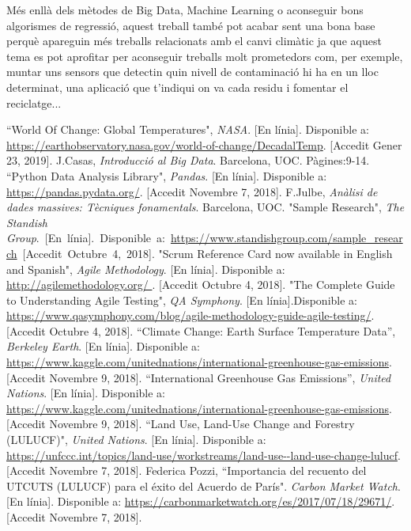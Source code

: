 \documentclass[10pt,a4paper,twocolumn,twoside]{article}
\begin{document}
Més enllà dels mètodes de Big Data, Machine Learning o aconseguir bons algorismes de regressió, aquest treball també pot acabar sent una bona base perquè apareguin més treballs relacionats amb el canvi climàtic ja que aquest tema es pot aprofitar per aconseguir treballs molt prometedors com, per exemple, muntar uns sensors que detectin quin nivell de contaminació hi ha en un lloc determinat, una aplicació que t'indiqui on va cada residu i fomentar el reciclatge...

\begin{thebibliography}{11}
``World Of Change: Global Temperatures", \textit{NASA}. [En línia]. Disponible a: \url{https://earthobservatory.nasa.gov/world-of-change/DecadalTemp}. [Accedit Gener 23, 2019].
J.Casas, \textit{Introducció al Big Data}. Barcelona, UOC. Pàgines:9-14.
 ``Python Data Analysis Library", \textit{Pandas}. [En línia]. Disponible a: \url{https://pandas.pydata.org/}. [Accedit Novembre 7, 2018].
F.Julbe, \textit{Anàlisi de dades massives: Tècniques fonamentals}. Barcelona, UOC.
"Sample Research", \textit{The Standish Group}.~[En~línia].~Disponible~a:~\url{https://www.standishgroup.com/sample_research}~[Accedit~Octubre~4,~2018].
"Scrum Reference Card now available in English and Spanish",  \textit{Agile Methodology}. [En línia]. Disponible a: \url{http://agilemethodology.org/ }. [Accedit Octubre 4, 2018].
"The Complete Guide to Understanding Agile Testing", \textit{QA Symphony}. [En línia].Disponible a: \url{https://www.qasymphony.com/blog/agile-methodology-guide-agile-testing/}. [Accedit Octubre 4, 2018].
``Climate Change: Earth Surface Temperature Data”, \textit{Berkeley Earth}. [En línia]. Disponible a: \url{ https://www.kaggle.com/unitednations/international-greenhouse-gas-emissions}. [Accedit Novembre 9, 2018].
 ``International Greenhouse Gas Emissions”, \textit{United Nations}. [En línia]. Disponible a: \url{ https://www.kaggle.com/unitednations/international-greenhouse-gas-emissions}. [Accedit Novembre 9, 2018].
 ``Land Use, Land-Use Change and Forestry (LULUCF)", \textit{United Nations}. [En línia]. Disponible a: \url{ https://unfccc.int/topics/land-use/workstreams/land-use--land-use-change-lulucf}. [Accedit Novembre 7, 2018].
Federica Pozzi, ``Importancia del recuento del UTCUTS (LULUCF) para el éxito del Acuerdo de París". \textit{Carbon Market Watch}. [En línia]. Disponible a: \url{https://carbonmarketwatch.org/es/2017/07/18/29671/}. [Accedit Novembre 7, 2018].

\end{thebibliography}
\end{document}
